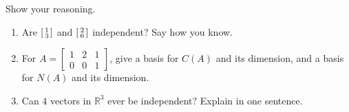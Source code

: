 \documentclass[10pt]{article}
\begin{document}
\begin{practicebox}
Show your reasoning.
\begin{enumerate}[leftmargin=1.6em, itemsep=2pt]
  \item Are $\begin{bsmallmatrix} 1\\3 \end{bsmallmatrix}$ and $\begin{bsmallmatrix} 2\\6 \end{bsmallmatrix}$ independent? Say how you know. \writeline
  \item For $A=\begin{bmatrix} 1 & 2 & 1 \\ 0 & 0 & 1 \end{bmatrix}$, give a basis for $C(A)$ and its dimension, and a basis for $N(A)$ and its dimension. \writeline
  \item Can $4$ vectors in $\mathbb{R}^3$ ever be independent? Explain in one sentence. \writeline
\end{enumerate}
\end{practicebox}
\end{document}
